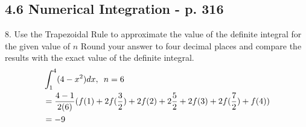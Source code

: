 \documentclass[11pt]{article}
\newcommand*{\set}{\setcounter{equation}{0}}
\begin{document}
\subsection{4.6 Numerical Integration - p. 316}
8. Use the Trapezoidal Rule to approximate the value of the definite integral for the given
value of $n$ Round your answer to four decimal places and
compare the results with the exact value of the definite integral.
\begin{align}
    \set
    &\int_{1}^{4}(4-x^2)dx,\,\,\, n=6\\
    &=\frac{4-1}{2(6)}(f(1)+2f(\frac{3}{2})+2f(2)+2\frac{5}{2}+2f(3)+2f(\frac{7}{2})+f(4))\\
    &=-9
\end{align}
\end{document}

